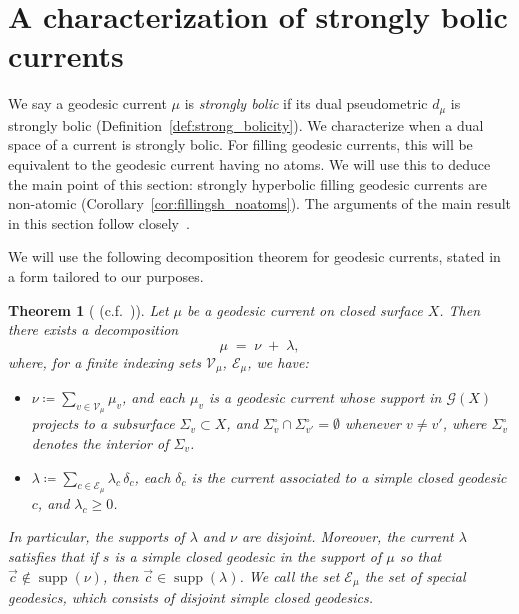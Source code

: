 \documentclass[12pt]{amsart}
\numberwithin{equation}{section}
\numberwithin{figure}{section}
\newtheorem{theorem}[equation]{Theorem}
\theoremstyle{definition}
\theoremstyle{plain}
\newcommand{\ora}[1]{\overrightarrow{#1}}
\DeclareMathOperator{\supp}{supp}
\begin{document}
\section{A characterization of strongly bolic currents}
\label{sec:bolic}




We say a geodesic current $\mu$ is \emph{strongly bolic} if its dual pseudometric $d_{\mu}$ is strongly bolic (Definition~\ref{def:strong_bolicity}).
We characterize when a dual space of a current is strongly bolic. For filling geodesic currents, this will be equivalent to the geodesic current having no atoms. We will use this to deduce the main point of this section: strongly hyperbolic filling geodesic currents are non-atomic (Corollary~\ref{cor:fillingsh_noatoms}). The arguments of the main result in this section follow closely~\cite[Proposition~6.9]{DRMG23:Duals}.

We will use the following decomposition theorem for geodesic currents, stated in a form tailored to our purposes.

\begin{theorem}[{\cite[Theorem~1.2(1)]{BIPP21:Currents} (c.f.~\cite[Proposition~A]{EM18:Ergodic})}]
Let $\mu$ be a geodesic current on closed surface $X$. Then there exists a decomposition
\begin{equation}\label{eq:current_decomposition}
\mu \;=\; \nu \;+\; \lambda,
\tag{1.1}
\end{equation}
where, for a finite indexing sets $\mathcal{V}_\mu$, $\mathcal{E}_\mu$, we have:
\begin{itemize}
\item $\nu \coloneqq \sum_{v \in \mathcal V_\mu} \mu_v$, and each $\mu_v$ is a geodesic current whose support in $\mathcal{G}(X)$ projects to a subsurface $\Sigma_v \subset X$, and $\Sigma_v^\circ \cap \Sigma_{v'}^\circ=\emptyset$ whenever $v \neq v'$, where $\Sigma_v^\circ$ denotes the interior of $\Sigma_v$.
\item $\lambda \coloneqq \sum_{c \in \mathcal E_\mu} \lambda_c \, \delta_c$, each $\delta_c$ is the current associated to a simple closed geodesic $c$, and $\lambda_c \geq 0$.
\end{itemize}
In particular, the supports of $\lambda$ and $\nu$ are disjoint.
Moreover, the current $\lambda$ satisfies that if $s$ is a simple closed geodesic in the support of $\mu$ so that $\ora{c} \notin \supp(\nu)$, then $\ora{c} \in \supp(\lambda)$.  We call the set $\mathcal{E}_\mu$ the set of special geodesics, which consists of disjoint simple closed geodesics.
\label{thm:structural_dec}
\end{theorem}
\end{document}

